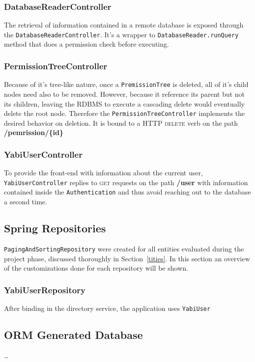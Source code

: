 \subsubsection{DatabaseReaderController}
The retrieval of information contained in a remote database is exposed through the \texttt{DatabaseReaderController}. It's a wrapper to \texttt{DatabaseReader.runQuery} method that does a permission check before executing.

\subsubsection{PermissionTreeController}
Because of it's tree-like nature, once a \texttt{PremissionTree} is deleted, all of it's child nodes need also to be removed. However, because it reference its parent but not its children, leaving the \gls{RDBMS} to execute a cascading delete would eventually delete the root node. Therefore the \texttt{PermissionTreeController} implements the desired behavior on deletion. It is bound to a \gls{HTTP} \textsc{delete} verb on the path \textbf{/pemrission/\{id\}} 

\subsubsection{YabiUserController}
To provide the front-end with information about the current user, \texttt{YabiUserController} replies to \textsc{get} requests on the path \textbf{/user} with information contained inside the \texttt{Authentication} and thus avoid reaching out to the database a second time.

\subsection{Spring Repositories}\label{impl:repos}
\texttt{PagingAndSortingRepository} were created for all entities evaluated during the project phase, discussed thoroughly in Section~\ref{tities}. In this section an overview of the customizations done for each repository will be shown.

\subsubsection{YabiUserRepository}
After binding in the directory service, the application uses \texttt{YabiUser}

\subsection{ORM Generated Database}
\dots
